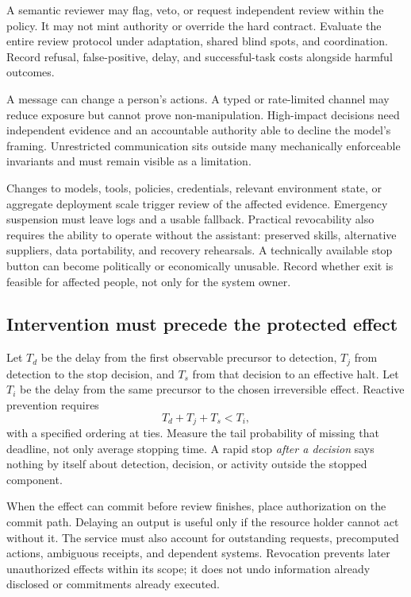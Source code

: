  A semantic reviewer may flag, veto, or request independent review within the policy. It may not mint authority or override the hard contract. Evaluate the entire review protocol under adaptation, shared blind spots, and coordination. Record refusal, false-positive, delay, and successful-task costs alongside harmful outcomes.

 A message can change a person's actions. A typed or rate-limited channel may reduce exposure but cannot prove non-manipulation. High-impact decisions need independent evidence and an accountable authority able to decline the model's framing. Unrestricted communication sits outside many mechanically enforceable invariants and must remain visible as a limitation.

 Changes to models, tools, policies, credentials, relevant environment state, or aggregate deployment scale trigger review of the affected evidence. Emergency suspension must leave logs and a usable fallback. Practical revocability also requires the ability to operate without the assistant: preserved skills, alternative suppliers, data portability, and recovery rehearsals. A technically available stop button can become politically or economically unusable. Record whether exit is feasible for affected people, not only for the system owner.

\subsection{Intervention must precede the protected effect}
\label{sec:timing}
Let $T_d$ be the delay from the first observable precursor to detection, $T_j$ from detection to the stop decision, and $T_s$ from that decision to an effective halt. Let $T_i$ be the delay from the same precursor to the chosen irreversible effect. Reactive prevention requires
\[
T_d+T_j+T_s<T_i,
\]
with a specified ordering at ties. Measure the tail probability of missing that deadline, not only average stopping time. A rapid stop \emph{after a decision} says nothing by itself about detection, decision, or activity outside the stopped component.

When the effect can commit before review finishes, place authorization on the commit path. Delaying an output is useful only if the resource holder cannot act without it. The service must also account for outstanding requests, precomputed actions, ambiguous receipts, and dependent systems. Revocation prevents later unauthorized effects within its scope; it does not undo information already disclosed or commitments already executed.

